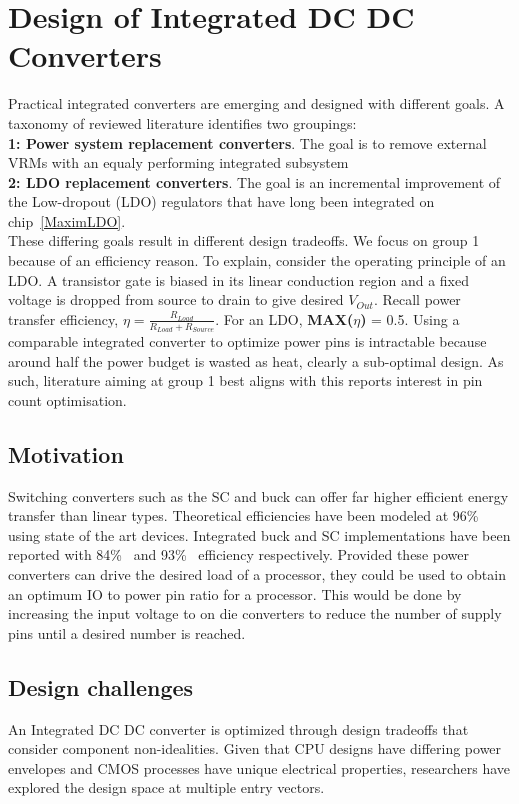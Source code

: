 \documentclass[letterpaper,twocolumn,10pt]{article}
\begin{document}
\section{Design of Integrated DC DC Converters}

Practical integrated converters are emerging and designed with different goals. A taxonomy of reviewed literature identifies two groupings:\\
\textbf{1: Power system replacement converters}. The goal is to remove external VRMs with an equaly performing integrated subsystem\\
\textbf{2: LDO replacement converters}. The goal is an incremental improvement of the Low-dropout (LDO) regulators that have long been integrated on chip~\ref{MaximLDO}.\\
These differing goals result in different design tradeoffs. We focus on group 1 because of an efficiency reason. To explain, consider the operating principle of an LDO. A transistor gate is biased in its linear conduction region and a fixed voltage is dropped from source to drain to give desired $V_{Out}$. Recall power transfer efficiency, $\eta = \frac{R_{Load}}{R_{Load} + R_{Source}}$. For an LDO, \textbf{MAX($\eta$)} = 0.5. Using a comparable integrated converter to optimize power pins is intractable because around half the power budget is wasted as heat, clearly a sub-optimal design. As such, literature aiming at group 1 best aligns with this reports interest in pin count optimisation.\\  

\subsection{Motivation}
Switching converters such as the SC and buck can offer far higher efficient energy transfer than linear types. Theoretical efficiencies have been modeled at 96\%~\cite{Rodriguez2014} using state of the art devices. Integrated buck and SC implementations have been reported with 84\%~\cite{Cheng2013} and 93\%~\cite{Damak2013} efficiency respectively. Provided these power converters can drive the desired load of a processor, they could be used to obtain an optimum IO to power pin ratio for a processor. This would be done by increasing the input voltage to on die converters to reduce the number of supply pins until a desired number is reached.  

\subsection{Design challenges}
An Integrated DC DC converter is optimized through design tradeoffs that consider component non-idealities. Given that CPU designs have differing power envelopes and CMOS processes have unique electrical properties, researchers have explored the design space at multiple entry vectors.\\  
\end{document}
